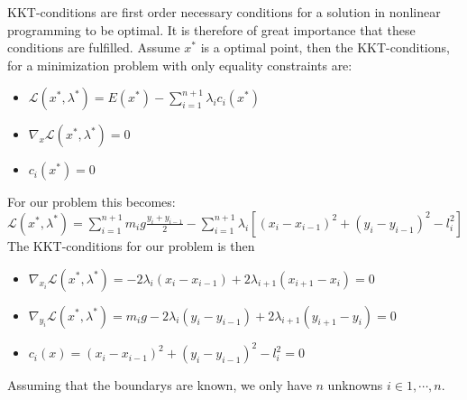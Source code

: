 
KKT-conditions are first order necessary conditions for a solution in nonlinear programming to be optimal. It is therefore of great importance that these conditions are fulfilled.
Assume $x^*$ is a optimal point, then the KKT-conditions, for a  minimization problem with only equality constraints are:
\begin{itemize}
\item $\mathcal{L}(x^*,\lambda^*) = E(x^*)- \sum\limits_{i=1}^{n+1}\lambda_i c_i(x^*)$
\item $\nabla_x \mathcal{L}(x^*,\lambda^*) = 0$
\item $c_i(x^*) = 0$
\end{itemize}

For our problem this becomes: \\
$\mathcal{L}(x^*,\lambda^*) = \sum \limits_{i=1}^{n+1} m_ig\frac{y_i+y_{i-1}}{2} -\sum\limits_{i=1}^{n+1}\lambda_i [(x_i-x_{i-1})^2 + (y_i-y_{i-1})^2-l^2_i]$\\
The KKT-conditions for our problem is then
\begin{itemize}
\item $\nabla_{x_i}\mathcal{L}(x^*,\lambda^*)= -2 \lambda_i (x_i-x_{i-1}) +2 \lambda_{i+1}(x_{i+1}-x_{i})=0$\\
\item $\nabla_{y_i}\mathcal{L}(x^*,\lambda^*)= m_i g - 2 \lambda_i (y_i-y_{i-1}) +2 \lambda_{i+1}(y_{i+1}-y_{i})=0$\\
\item $c_i(x) = (x_i-x_{i-1})^2 + (y_i-y_{i-1})^2-l^2_i=0$\\
\end{itemize}

Assuming that the boundarys are known, we only have $n$ unknowns $ i \in { 1,\cdots, n}.$\\
